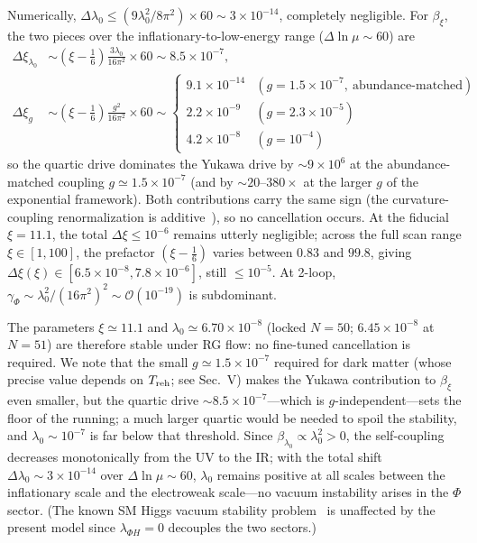 \documentclass[pdflatex,sn-mathphys-num]{sn-jnl}
\theoremstyle{thmstyleone}
\begin{document}
Numerically, $\Delta\lambda_0\leq(9\lambda_0^2/8\pi^2)\times60\sim3\times10^{-14}$, completely negligible. For $\beta_\xi$, the two pieces over the inflationary-to-low-energy range ($\Delta\ln\mu\sim60$) are
\begin{align}
\Delta\xi_{\lambda_0}&\sim(\xi-\tfrac{1}{6})\frac{3\lambda_0}{16\pi^2}\times60\sim8.5\times10^{-7},
\label{eq:dxilam}\\
\Delta\xi_g&\sim(\xi-\tfrac{1}{6})\frac{g^2}{16\pi^2}\times60\sim
\begin{cases}
9.1\times10^{-14} & (g=1.5\times10^{-7},\ \text{abundance-matched})\\
2.2\times10^{-9} & (g=2.3\times10^{-5})\\
4.2\times10^{-8} & (g=10^{-4})
\end{cases}
\label{eq:dxig}
\end{align}
so the quartic drive dominates the Yukawa drive by $\sim9\times10^{6}$ at the abundance-matched coupling $g\simeq1.5\times10^{-7}$ (and by $\sim20$--$380\times$ at the larger $g$ of the exponential framework). Both contributions carry the same sign (the curvature-coupling renormalization is additive~\cite{BirrellDavies,Buchbinder1992}), so no cancellation occurs. At the fiducial $\xi=11.1$, the total $\Delta\xi\leq10^{-6}$ remains utterly negligible; across the full scan range $\xi\in[1,100]$, the prefactor $(\xi-\frac16)$ varies between $0.83$ and $99.8$, giving $\Delta\xi(\xi)\in[6.5\times10^{-8},7.8\times10^{-6}]$, still $\leq10^{-5}$. At 2-loop, $\gamma_\Phi\sim\lambda_0^2/(16\pi^2)^2\sim\mathcal{O}(10^{-19})$ is subdominant.

The parameters $\xi\simeq11.1$ and $\lambda_0\simeq6.70\times10^{-8}$ (locked $N=50$; $6.45\times10^{-8}$ at $N=51$) are therefore stable under RG flow: no fine-tuned cancellation is required. We note that the small $g\simeq1.5\times10^{-7}$ required for dark matter (whose precise value depends on $T_{\rm reh}$; see Sec.~V) makes the Yukawa contribution to $\beta_\xi$ even smaller, but the quartic drive $\sim8.5\times10^{-7}$---which is $g$-independent---sets the floor of the running; a much larger quartic would be needed to spoil the stability, and $\lambda_0\sim10^{-7}$ is far below that threshold. Since $\beta_{\lambda_0}\propto\lambda_0^2>0$, the self-coupling decreases monotonically from the UV to the IR; with the total shift $\Delta\lambda_0\sim3\times10^{-14}$ over $\Delta\ln\mu\sim60$, $\lambda_0$ remains positive at all scales between the inflationary scale and the electroweak scale---no vacuum instability arises in the $\Phi$ sector. (The known SM Higgs vacuum stability problem~\cite{Buttazzo2013} is unaffected by the present model since $\lambda_{\Phi H}=0$ decouples the two sectors.)
\end{document}
